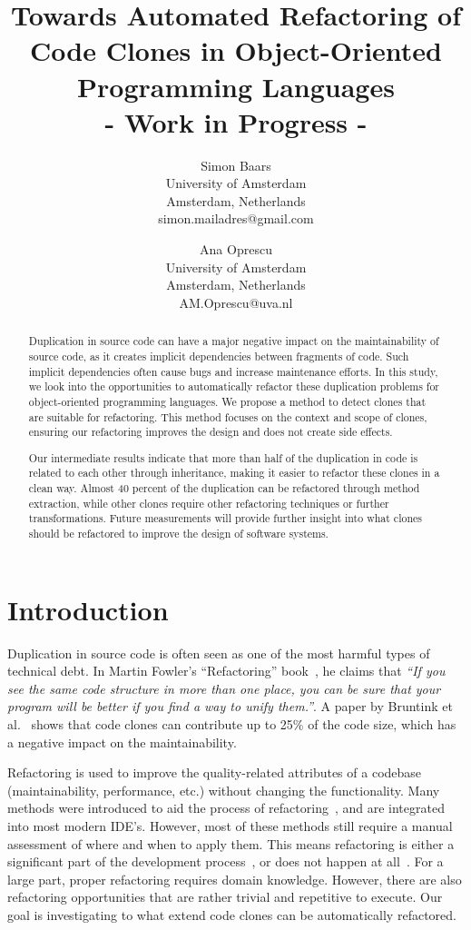 \documentclass[a4paper]{article}
\title{Towards Automated Refactoring of Code Clones in Object-Oriented Programming Languages\\- Work in Progress -}
\author{
Simon Baars \\ University of Amsterdam\\
                Amsterdam, Netherlands \\ simon.mailadres@gmail.com
\and
Ana Oprescu \\ University of Amsterdam\\
                Amsterdam, Netherlands \\
                AM.Oprescu@uva.nl
}
\begin{document}
\maketitle

\begin{abstract}
Duplication in source code can have a major negative impact on the maintainability of source code, as it creates implicit dependencies between fragments of code. Such implicit dependencies often cause bugs and increase maintenance efforts. In this study, we look into the opportunities to automatically refactor these duplication problems for object-oriented programming languages. We propose a method to detect clones that are suitable for refactoring. This method focuses on the context and scope of clones, ensuring our refactoring improves the design and does not create side effects.

Our intermediate results indicate that more than half of the duplication in code is related to each other through inheritance, making it easier to refactor these clones in a clean way. Almost 40 percent of the duplication can be refactored through method extraction, while other clones require other refactoring techniques or further transformations. Future measurements will provide further insight into what clones should be refactored to improve the design of software systems.
\end{abstract}

\section{Introduction}
Duplication in source code is often seen as one of the most harmful types of technical debt. In Martin Fowler's ``Refactoring'' book~\cite{fowler1999refactoring}, he claims that \textit{``If you see the same code structure in more than one place, you can be sure that your program will be better if you find a way to unify them.''}. A paper by Bruntink et al.~\cite{bruntink2005use} shows that code clones can contribute up to 25\% of the code size, which has a negative impact on the maintainability.

Refactoring is used to improve the quality-related attributes of a codebase (maintainability, performance, etc.) without changing the functionality. Many methods were introduced to aid the process of refactoring~\cite{fowler1999refactoring, wake2004refactoring}, and are integrated into most modern IDE's. However, most of these methods still require a manual assessment of where and when to apply them. This means refactoring is either a significant part of the development process~\cite{lientz1978characteristics, mens2004survey}, or does not happen at all~\cite{mens2003refactoring}. For a large part, proper refactoring requires domain knowledge. However, there are also refactoring opportunities that are rather trivial and repetitive to execute. Our goal is investigating to what extend code clones can be automatically refactored.
\end{document}
